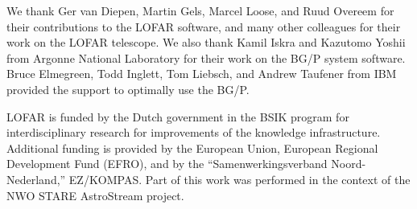 \begin{acknowledgements}
We thank Ger van Diepen, Martin Gels, Marcel Loose, and Ruud Overeem
for their contributions to the LOFAR software, and many other colleagues
for their work on the LOFAR telescope.
We also thank Kamil Iskra and Kazutomo Yoshii from Argonne National Laboratory
for their work on the BG/P system software.
Bruce Elmegreen, Todd Inglett, Tom Liebsch, and Andrew Taufener from IBM
provided the support to optimally use the BG/P.

LOFAR is funded by the Dutch government in the BSIK program for
interdisciplinary research for improvements of the knowledge
infrastructure.  Additional funding is provided by the European Union,
European Regional Development Fund (EFRO), and by the
``Samenwerkingsverband Noord-Nederland,'' EZ/KOMPAS. Part of this work was
performed in the context of the NWO STARE AstroStream project.
\end{acknowledgements}


%





